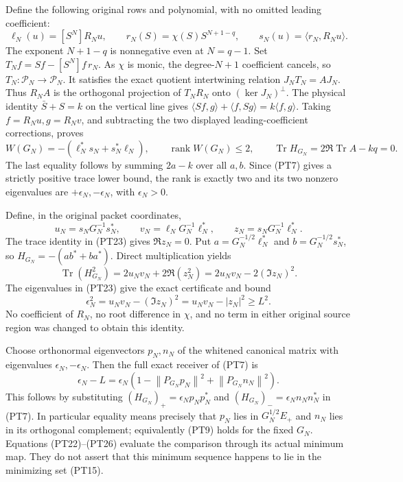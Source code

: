 \documentclass[11pt,a4paper]{article}
\providecommand{\rank}{\operatorname{rank}}
\providecommand{\Tr}{\operatorname{Tr}}
\providecommand{\PP}{\mathcal P}
\providecommand{\norm}[1]{\left\lVert#1\right\rVert}
\begin{document}
Define the following original rows and polynomial, with no omitted
leading coefficient:
\begin{equation}\tag{PT22}
 \ell_N(u)=[S^N]R_Nu,\qquad
 r_N(S)=\chi(S)S^{N+1-q},\qquad
 s_N(u)=\langle r_N,R_Nu\rangle.
\end{equation}
The exponent \(N+1-q\) is nonnegative even at \(N=q-1\).
Set \(T_Nf=Sf-[S^N]f\,r_N\). As \(\chi\) is monic,
the degree-\(N+1\) coefficient cancels, so \(T_N:\PP_N\to\PP_N\).
It satisfies the exact quotient intertwining relation
\(J_NT_N=AJ_N\). Thus \(R_NA\) is the orthogonal projection
of \(T_NR_N\) onto \((\ker J_N)^\perp\).
The physical identity \(\bar S+S=k\) on the vertical line gives
\(\langle Sf,g\rangle+\langle f,Sg\rangle=k\langle f,g\rangle\).
Taking \(f=R_Nu,g=R_Nv\), and subtracting the two displayed
leading-coefficient corrections, proves
\begin{equation}\tag{PT23}
 W(G_N)=-(\ell_N^*s_N+s_N^*\ell_N),\qquad
 \rank W(G_N)\le2,\qquad
 \Tr H_{G_N}=2\Re\Tr A-kq=0.
\end{equation}
The last equality follows by summing \(2a-k\) over all \(a,b\).
Since (PT7) gives a strictly positive trace lower bound, the rank
is exactly two and its two nonzero eigenvalues are
\(+\epsilon_N,-\epsilon_N\), with \(\epsilon_N>0\).

Define, in the original packet coordinates,
\begin{equation}\tag{PT24}
 u_N=s_NG_N^{-1}s_N^*,\qquad
 v_N=\ell_NG_N^{-1}\ell_N^*,\qquad
 z_N=s_NG_N^{-1}\ell_N^*.
\end{equation}
The trace identity in (PT23) gives \(\Re z_N=0\). Put
\(a=G_N^{-1/2}\ell_N^*\) and \(b=G_N^{-1/2}s_N^*\),
so \(H_{G_N}=-(ab^*+ba^*)\). Direct multiplication yields
\[
 \Tr(H_{G_N}^2)=2u_Nv_N+2\Re(z_N^2)
                 =2u_Nv_N-2(\Im z_N)^2.
\]
The eigenvalues in (PT23) give the exact certificate and bound
\begin{equation}\tag{PT25}
 \epsilon_N^2=u_Nv_N-(\Im z_N)^2
             =u_Nv_N-|z_N|^2\ge L^2.
\end{equation}
No coefficient of \(R_N\), no root difference in \(\chi\),
and no term in either original source region was changed to obtain
this identity.

Choose orthonormal eigenvectors \(p_N,n_N\) of the whitened
canonical matrix with eigenvalues \(\epsilon_N,-\epsilon_N\).
Then the full exact receiver of (PT7) is
\begin{equation}\tag{PT26}
 \epsilon_N-L
 =\epsilon_N\left(1-\norm{P_{G_N}p_N}^2
                         +\norm{P_{G_N}n_N}^2\right).
\end{equation}
This follows by substituting
\((H_{G_N})_+=\epsilon_Np_Np_N^*\) and
\((H_{G_N})_-=\epsilon_Nn_Nn_N^*\) in (PT7).
In particular equality means precisely that \(p_N\) lies in
\(G_N^{1/2}E_+\) and \(n_N\) lies in its orthogonal complement;
equivalently (PT9) holds for the fixed \(G_N\).
Equations (PT22)--(PT26) evaluate the comparison through its actual
minimum map. They do not assert that this minimum sequence happens
to lie in the minimizing set (PT15).
\end{document}
